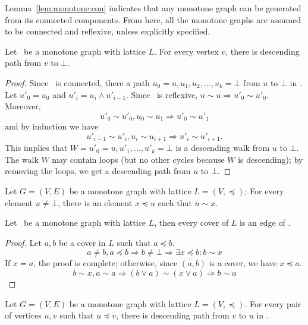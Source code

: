 Lemma~\ref{lem:monotone:con} indicates that any monotone graph can be generated
from its connected components. From here, all the monotone graphs are
assumed to be connected and reflexive, unless explicitly specified.

\begin{lemma}
Let \mG\ be a monotone graph with lattice \(L\)\@.
For every vertex \(v\), there is descending path from
\(v\) to \(\bot\)\@.
\end{lemma}

\begin{proof}
Since \mG\ is connected, there a path \(u_0=u,u_1,u_2,\dotsc,u_k=\bot\) from \(u\) to 
\(\bot\) in \mG\@. Let \(u'_0=u_0\) and \(u'_i = u_i\wedge u'_{i-1}\)\@.
Since \mG\ is reflexive, \(u\sim u \Rightarrow u'_0\sim u'_0\)\@. Moreover,
\[u'_0\sim u'_0, u_0\sim u_1 \Rightarrow u'_0\sim u'_1\]
and by induction we have
\[u'_{i-1}\sim u'_i, u_i\sim u_{i+1} \Rightarrow u'_i\sim u'_{i+1}.\]
This implies that \(W=u'_0=u,u'_1,\dotsc,u'_k=\bot\) is a descending walk from 
\(u\) to \(\bot\)\@. The walk \(W\) may contain loops (but no other cycles because \(W\) is descending);
by removing the loops, we get a descending path from \(u\) to \(\bot\)\@.
\end{proof}

\begin{cor}
Let \(G=(V,E)\) be a monotone graph with lattice \(L=(V,\preceq)\); 
For every element \(u \neq \bot\),
there is an element \(x \preceq u\) such that \(u\sim x\)\@.
\end{cor}

\begin{lemma}
Let \mG\ be a monotone graph with lattice \(L\), then every cover
of \(L\) is an edge of \mG\@.
\end{lemma}

\begin{proof}
Let \(a,b\) be a cover in \(L\) such that \(a \preceq b\)\@.
\[a \neq b, a \preceq b \Rightarrow b\neq \bot \Rightarrow \exists x \preceq b: b\sim x\]
If \(x=a\), the proof is complete; otherwise, since \((a,b)\) is a cover, we have \(x\preceq a\).
\[b\sim x,a\sim a \Rightarrow (b \vee a) \sim (x \vee a) \Rightarrow b\sim a\]\@
\end{proof}

\begin{cor}
Let \(G=(V,E)\) be a monotone graph with lattice \(L=(V, \preceq)\)\@.
For every pair of vertices \(u,v\) such that \(u\preceq v\), there is descending path from
\(v\) to \(u\) in \mG\@. 
\end{cor}

